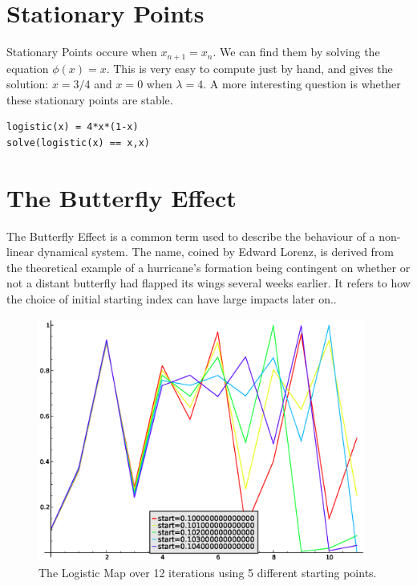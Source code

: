 \documentclass[a4paper]{article}
\begin{document}
\section{Stationary Points}
Stationary Points occure when $x_{n+1}=x_n$. We can find them by solving the equation $\phi(x)=x$. This is very easy to compute just by hand, and gives the solution: $x=3/4$ and $x=0$ when $\lambda =4$. A more interesting question is whether these stationary points are stable.

\begin{verbatim}
logistic(x) = 4*x*(1-x)
solve(logistic(x) == x,x)
\end{verbatim}


\section{The Butterfly Effect}
The Butterfly Effect is a common term used to describe the behaviour of a non-linear dynamical system. The name, coined by Edward Lorenz, is derived from the theoretical example of a hurricane's formation being contingent on whether or not a distant butterfly had flapped its wings several weeks earlier.\cite{wiki:xxx} It refers to how the choice of initial starting index can have large impacts later on..
\begin{figure}[htdp]
\begin{center}
\includegraphics[keepaspectratio=False, width=\linewidth,height=8cm]{butterflyeffect}
\end{center}
\caption{The Logistic Map over 12 iterations using 5 different starting points.}
\label{butterflyeffect}
\end{figure}



\end{document}
